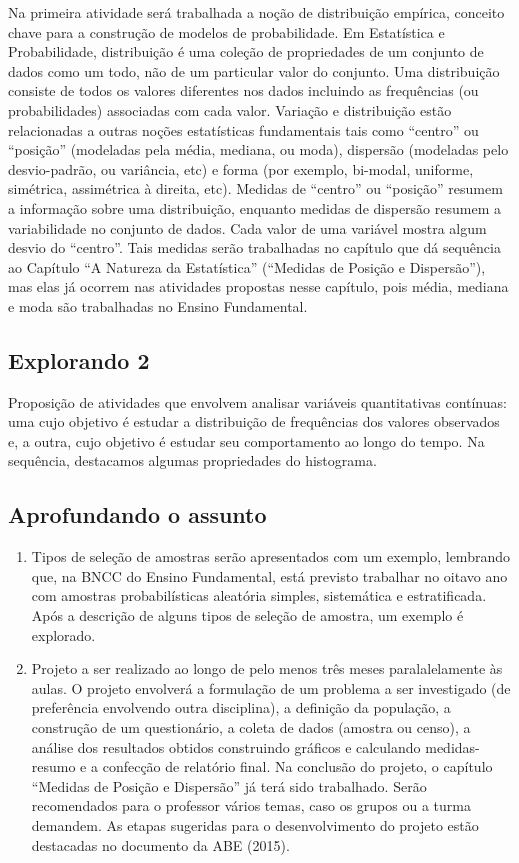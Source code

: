 \begin{apresentacao}
Na primeira atividade será trabalhada a noção de distribuição empírica, conceito chave para a construção de modelos de probabilidade. Em Estatística e Probabilidade, distribuição é uma coleção de propriedades de um conjunto de dados como um todo, não de um particular valor do conjunto. Uma distribuição consiste de todos os valores diferentes nos dados incluindo as frequências (ou probabilidades) associadas com cada valor. Variação e distribuição estão relacionadas a outras noções estatísticas fundamentais tais como “centro” ou “posição” (modeladas pela média, mediana, ou moda), dispersão (modeladas pelo desvio-padrão, ou variância, etc) e forma (por exemplo, bi-modal, uniforme, simétrica, assimétrica à direita, etc). Medidas de “centro” ou “posição” resumem a informação sobre uma distribuição, enquanto medidas de dispersão resumem a variabilidade no conjunto de dados. Cada valor de uma variável mostra algum desvio do “centro”. Tais medidas serão trabalhadas no capítulo que dá sequência ao Capítulo “A Natureza da Estatística” (“Medidas de Posição e Dispersão”), mas elas já ocorrem nas atividades propostas nesse capítulo, pois média, mediana e moda são trabalhadas no Ensino Fundamental.

\subsection{Explorando 2} Proposição de atividades que envolvem analisar variáveis quantitativas contínuas: uma cujo objetivo é estudar a distribuição de frequências dos valores observados e, a outra, cujo objetivo é estudar seu comportamento ao longo do tempo. Na sequência, destacamos algumas propriedades do histograma.

\subsection{Aprofundando o assunto}
\begin{enumerate}
\item {} 
Tipos de seleção de amostras serão apresentados com um exemplo, lembrando que, na BNCC do Ensino Fundamental, está previsto trabalhar no oitavo ano com amostras probabilísticas aleatória simples, sistemática e estratificada. Após a descrição de alguns tipos de seleção de amostra, um exemplo é explorado.

\item {} 
Projeto a ser realizado ao longo de pelo menos três meses paralalelamente às aulas. O projeto envolverá a formulação de um problema a ser investigado (de preferência envolvendo outra disciplina), a definição da população, a construção de um questionário, a coleta de dados (amostra ou censo), a análise dos resultados obtidos construindo gráficos e calculando medidas-resumo e a confecção de relatório final. Na conclusão do projeto, o capítulo “Medidas de Posição e Dispersão” já terá sido trabalhado. Serão recomendados para o professor vários temas, caso os grupos ou a turma demandem. As etapas sugeridas para o desenvolvimento do projeto estão destacadas no documento da ABE (2015).


\end{enumerate}
\end{apresentacao}
